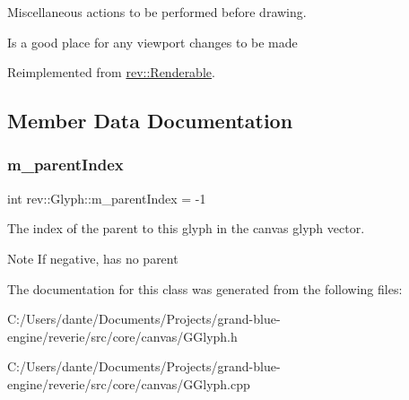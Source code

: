 Miscellaneous actions to be performed before drawing. 

Is a good place for any viewport changes to be made 

Reimplemented from \mbox{\hyperlink{classrev_1_1_renderable_ac1fe33dec408d65bbae10e24fbedc6bc}{rev\+::\+Renderable}}.



\subsection{Member Data Documentation}
\mbox{\label{classrev_1_1_glyph_a2c8214da501a742bea70dde66098922a}} 
\subsubsection{\texorpdfstring{m\_parentIndex}{m\_parentIndex}}
{\footnotesize\ttfamily int rev\+::\+Glyph\+::m\+\_\+parent\+Index = -\/1\hspace{0.3cm}{\ttfamily [protected]}}



The index of the parent to this glyph in the canvas glyph vector. 

\begin{DoxyNote}{Note}
If negative, has no parent 
\end{DoxyNote}


The documentation for this class was generated from the following files\+:\begin{DoxyCompactItemize}
\item 
C\+:/\+Users/dante/\+Documents/\+Projects/grand-\/blue-\/engine/reverie/src/core/canvas/G\+Glyph.\+h\item 
C\+:/\+Users/dante/\+Documents/\+Projects/grand-\/blue-\/engine/reverie/src/core/canvas/G\+Glyph.\+cpp\end{DoxyCompactItemize}

